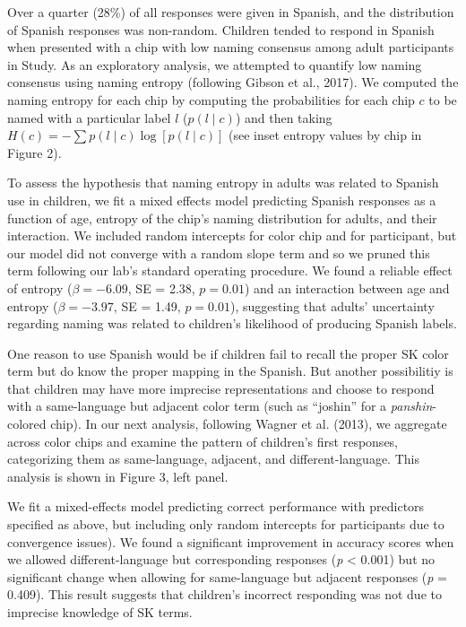 \documentclass[
  english,
  ,man,floatsintext]{apa6}
\begin{document}
Over a quarter (28\%) of all responses were given in Spanish, and the distribution of Spanish responses was non-random. Children tended to respond in Spanish when presented with a chip with low naming consensus among adult participants in Study. As an exploratory analysis, we attempted to quantify low naming consensus using naming entropy (following Gibson et al., 2017). We computed the naming entropy for each chip by computing the probabilities for each chip \(c\) to be named with a particular label \(l\) (\(p(l \mid c)\)) and then taking \(H(c) = - \sum{p(l\mid c) \log[p(l \mid c)]}\) (see inset entropy values by chip in Figure 2).

To assess the hypothesis that naming entropy in adults was related to Spanish use in children, we fit a mixed effects model predicting Spanish responses as a function of age, entropy of the chip's naming distribution for adults, and their interaction. We included random intercepts for color chip and for participant, but our model did not converge with a random slope term and so we pruned this term following our lab's standard operating procedure. We found a reliable effect of entropy (\(\beta = -6.09\), SE = 2.38, \(p = 0.01\)) and an interaction between age and entropy (\(\beta = -3.97\), SE = 1.49, \(p = 0.01\)), suggesting that adults' uncertainty regarding naming was related to children's likelihood of producing Spanish labels.

One reason to use Spanish would be if children fail to recall the proper SK color term but do know the proper mapping in the Spanish. But another possibilitiy is that children may have more imprecise representations and choose to respond with a same-language but adjacent color term (such as \enquote{joshin} for a \emph{panshin}-colored chip). In our next analysis, following Wagner et al. (2013), we aggregate across color chips and examine the pattern of children's first responses, categorizing them as same-language, adjacent, and different-language. This analysis is shown in Figure 3, left panel.

We fit a mixed-effects model predicting correct performance with predictors specified as above, but including only random intercepts for participants due to convergence issues). We found a significant improvement in accuracy scores when we allowed different-language but corresponding responses (\emph{p} \textless{} 0.001) but no significant change when allowing for same-language but adjacent responses (\emph{p} = 0.409). This result suggests that children's incorrect responding was not due to imprecise knowledge of SK terms.
\end{document}
